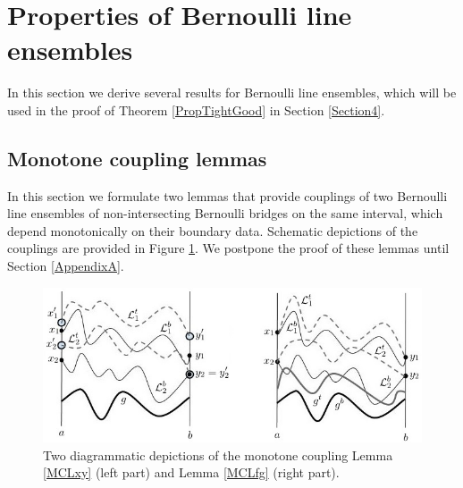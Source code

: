 %
\section{Properties of Bernoulli line ensembles}\label{Section3} In this section we derive several results for Bernoulli line ensembles, which will be used in the proof of Theorem \ref{PropTightGood} in Section \ref{Section4}.


%
\subsection{Monotone coupling lemmas}\label{Section3.1}
 In this section we formulate two lemmas that provide couplings of two Bernoulli line ensembles of non-intersecting Bernoulli bridges on the same interval, which depend monotonically on their boundary data. Schematic depictions of the couplings are provided in Figure \ref{fig:MCL}. We postpone the proof of these lemmas until Section \ref{AppendixA}. 
\begin{figure}[ht]
\begin{center}
  \includegraphics[scale = 0.8]{S2_1_new.jpg}
  \caption{Two diagrammatic depictions of the monotone coupling Lemma \ref{MCLxy} (left part) and Lemma \ref{MCLfg} (right part).}
  \label{fig:MCL}
  \end{center}
\end{figure}

